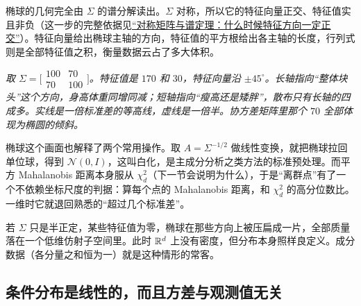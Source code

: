 椭球的几何完全由 \(\Sigma\) 的谱分解读出。\(\Sigma\) 对称，所以它的特征向量正交、特征值实且非负（这一步的完整依据见\hyperref[sec:03-Linear-Algebra/06-Symmetric-and-Positive-Definite-Matrices/01]{``对称矩阵与谱定理：什么时候特征方向一定正交''}）。特征向量给出椭球主轴的方向，特征值的平方根给出各主轴的长度，行列式则是全部特征值之积，衡量数据云占了多大体积。

\begin{center}

\emph{取 \(\Sigma=\bigl[\begin{smallmatrix}100&70\\70&100\end{smallmatrix}\bigr]\)。特征值是 \(170\) 和 \(30\)，特征向量沿 \(\pm45^\circ\)。长轴指向``整体块头''这个方向，身高体重同增同减；短轴指向``瘦高还是矮胖''，散布只有长轴的四成多。实线是一倍标准差的等高线，虚线是一倍半。协方差矩阵里那个 \(70\) 全部体现为椭圆的倾斜。}
\end{center}

椭球这个画面也解释了两个常用操作。取 \(A=\Sigma^{-1/2}\) 做线性变换，就把椭球拉回单位球，得到 \(\mathcal N(0,I)\)，这叫白化，是主成分分析之类方法的标准预处理。而平方 Mahalanobis 距离本身服从 \(\chi^2_d\)（下一节会说明为什么），于是``离群点''有了一个不依赖坐标尺度的判据：算每个点的 Mahalanobis 距离，和 \(\chi^2_d\) 的高分位数比。一维时它就退回熟悉的``超过几个标准差''。

若 \(\Sigma\) 只是半正定，某些特征值为零，椭球在那些方向上被压扁成一片，全部质量落在一个低维仿射子空间里。此时 \(\mathbb{R}^d\) 上没有密度，但分布本身照样良定义。成分数据（各分量之和恒为一）就是这种情形的常客。

\subsection{条件分布是线性的，而且方差与观测值无关}

